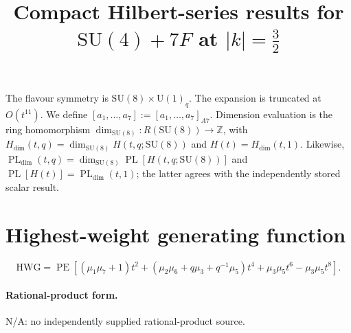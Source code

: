 \documentclass[10pt]{article}
\title{Compact Hilbert-series results for $\mathrm{SU(4)}+7F$ at $\lvert k\rvert=\frac{3}{2}$}
\date{}
\newcommand{\PE}{\operatorname{PE}}
\begin{document}
\maketitle
The flavour symmetry is $\mathrm{SU}(8)\times\mathrm{U}(1)_{q}$.
The expansion is truncated at $O(t^{11})$.  We define
$[a_1,\ldots,a_{7}]:=[a_1,\ldots,a_{7}]_{A7}$.
Dimension evaluation is the ring homomorphism
$\dim_{\mathrm{SU}(8)}:R(\mathrm{SU}(8))\to\mathbb{Z}$, with
$H_{\mathrm{dim}}(t,q)=\dim_{\mathrm{SU}(8)}H(t,q;\mathrm{SU}(8))$
and $H(t)=H_{\mathrm{dim}}(t,1)$. Likewise,
$\operatorname{PL}_{\mathrm{dim}}(t,q)=\dim_{\mathrm{SU}(8)}
\operatorname{PL}[H(t,q;\mathrm{SU}(8))]$ and
$\operatorname{PL}[H(t)]=\operatorname{PL}_{\mathrm{dim}}(t,1)$;
the latter agrees with the independently stored scalar result.


\section{Highest-weight generating function}
\begin{equation}
\mathrm{HWG}=\PE\!\left[(\mu_1\mu_7+1)t^2+(\mu_2\mu_6+q\mu_3+q^{-1}\mu_5)t^4
+\mu_3\mu_5t^6-\mu_3\mu_5t^8\right].
\end{equation}
\paragraph{Rational-product form.} N/A: no independently supplied rational-product source.
\end{document}
